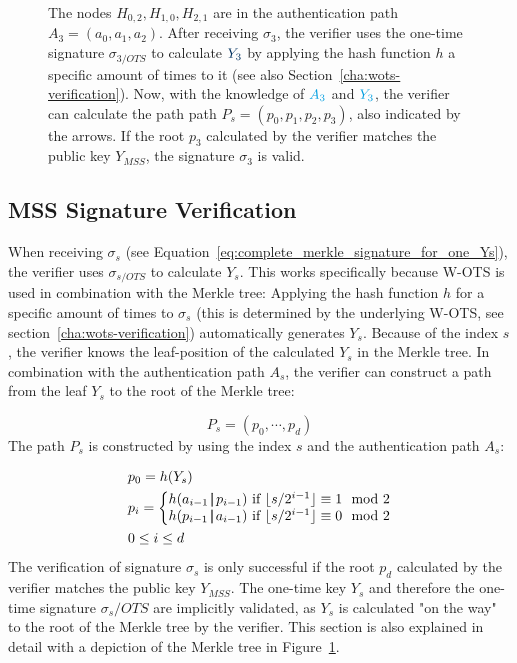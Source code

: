 \begin{figure}
{The nodes $H_{0,2}, H_{1,0}, H_{2,1}$ are in the \textcolor{cyan_tud}{authentication path $A_3 = (a_0, a_1, a_2)$}. After receiving $\sigma_3$, the verifier uses the one-time signature \textcolor{cyan_tud}{$\sigma_{3/OTS}$} to calculate $\textcolor{darkblue_tud}{Y_3}$ by applying the hash function $h$ a specific amount of times to it (see also Section~\ref{cha:wots-verification}).
Now, with the knowledge of $\textcolor{cyan_tud}{A_3}$ and $\textcolor{cyan_tud}{Y_3}$, the verifier can calculate the path \textcolor{darkblue_tud}{path $P_s = (p_0, p_1, p_2, p_3)$}, also indicated by the arrows. If the root $p_3$ calculated by the verifier matches the public key $Y_{MSS}$, the signature $\sigma_3$ is valid.}
\label{img:merkle_tree_signature_gen}
\end{figure}


\subsection{MSS Signature Verification}
When receiving $\sigma_s$ (see Equation~\ref{eq:complete_merkle_signature_for_one_Ys}), the verifier uses $\sigma_{s/OTS}$ to calculate $Y_s$. This works specifically because W-OTS is used in combination with the Merkle tree: Applying the hash function $h$ for a specific amount of times to $\sigma_s$ (this is determined by the underlying W-OTS, see section~\ref{cha:wots-verification}) automatically generates $Y_s$.
Because of the index $s$, the verifier knows the leaf-position of the calculated $Y_s$ in the Merkle tree. 
In combination with the authentication path $A_s$, the verifier can construct a path from the leaf $Y_s$ to the root of the Merkle tree: 

\begin{equation}
P_s = (p_0, \cdots, p_d)
\end{equation}
The path $P_s$ is constructed by using the index $s$ and the authentication path $A_s$:

\begin{align}
\label{eq:merkle_verifier_path_calculation}
&p_0 = h(Y_s) \\
&p_{i} = 
\left\{\begin{matrix} \nonumber
h(a_{i-1} \operatorname{|\!\!|} p_{i-1}) \text{ if } \lfloor s/2^{i-1}\rfloor \equiv 1 \mod{2} \\
h(p_{i-1} \operatorname{|\!\!|} a_{i-1}) \text{ if } \lfloor s/2^{i-1}\rfloor \equiv 0 \mod{2}
\end{matrix}\right.  \nonumber \\
&0 \leq i \leq d  \nonumber 
\end{align}
The verification of signature $\sigma_s$ is only successful if the root $p_d$ calculated by the verifier matches the public key $Y_{MSS}$. The one-time key $Y_s$ and therefore the one-time signature $\sigma_s/OTS$ are implicitly validated, as $Y_s$ is calculated "on the way" to the root of the Merkle tree by the verifier.
This section is also explained in detail with a depiction of the Merkle tree in Figure~\ref{img:merkle_tree_signature_gen}.

